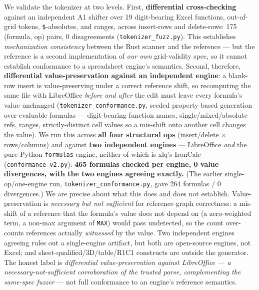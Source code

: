 \documentclass[
  11pt,
]{article}
\begin{document}
We validate the tokenizer at two levels. First, \textbf{differential
cross-checking} against an independent A1 shifter over 19 digit-bearing
Excel functions, out-of-grid tokens, \texttt{\$}-absolutes, and ranges,
across insert-rows and delete-rows: 175 (formula, op) pairs, 0
disagreements (\texttt{tokenizer\_fuzz.py}). This establishes
\emph{mechanization consistency} between the Rust scanner and the
reference --- but the reference is a second implementation of \emph{our
own} grid-validity spec, so it cannot establish conformance to a
spreadsheet engine's semantics. Second, therefore, \textbf{differential
value-preservation against an independent engine}: a blank-row insert is
value-preserving under a correct reference shift, so recomputing the
same file with LibreOffice \emph{before and after} the edit must leave
every formula's value unchanged (\texttt{tokenizer\_conformance.py},
seeded property-based generation over evaluable formulas ---
digit-bearing function names, single/mixed/absolute refs, ranges,
strictly-distinct cell values so a mis-shift onto another cell changes
the value). We run this across \textbf{all four structural ops}
(insert/delete × rows/columns) and against \textbf{two independent
engines} --- LibreOffice \emph{and} the pure-Python \texttt{formulas}
engine, neither of which is xlq's IronCalc
(\texttt{conformance\_v2.py}): \textbf{465 formulas checked per engine,
0 value divergences, with the two engines agreeing exactly.} (The
earlier single-op/one-engine run, \texttt{tokenizer\_conformance.py},
gave 264 formulas / 0 divergences.) We are precise about what this does
and does not establish. Value-preservation is \emph{necessary but not
sufficient} for reference-graph correctness: a mis-shift of a reference
that the formula's value does not depend on (a zero-weighted term, a
non-max argument of \texttt{MAX}) would pass undetected, so the count
over-counts references actually \emph{witnessed} by the value. Two
independent engines agreeing rules out a single-engine artifact, but
both are open-source engines, not Excel; and
sheet-qualified/3D/table/R1C1 constructs are outside the generator. The
honest label is \emph{differential value-preservation against
LibreOffice --- a necessary-not-sufficient corroboration of the trusted
parse, complementing the same-spec fuzzer} --- not full conformance to
an engine's reference semantics.
\end{document}
